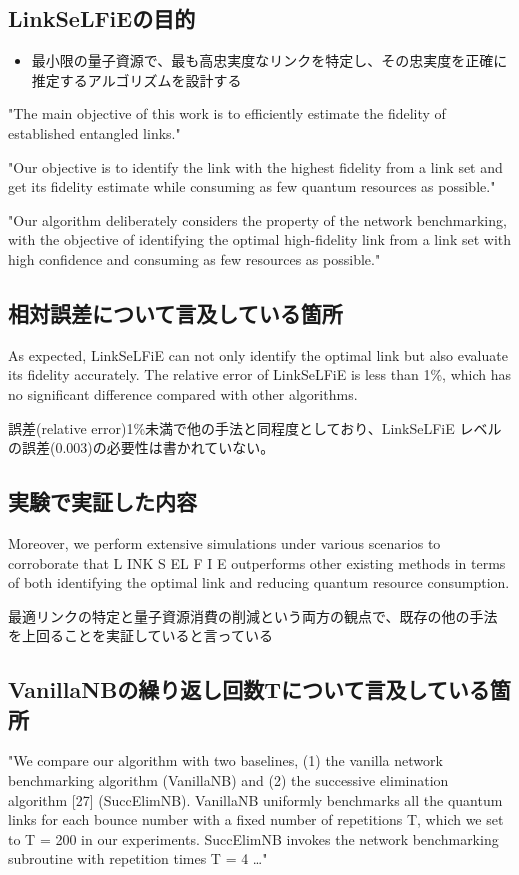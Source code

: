 \documentclass[conference]{IEEEtran}
\begin{document}
\subsection{LinkSeLFiEの目的}
\label{sec:orgf1f29e5}
\begin{itemize}
\item 最小限の量子資源で、最も高忠実度なリンクを特定し、その忠実度を正確に推定するアルゴリズムを設計する
\end{itemize}

"The main objective of this work is to efficiently estimate the fidelity of established entangled links."

"Our objective is to identify the link with the highest fidelity from a
link set and get its fidelity estimate while consuming as few quantum
resources as possible."

"Our algorithm deliberately considers the property of the network
benchmarking, with the objective of identifying the optimal
high-fidelity link from a link set with high confidence and consuming
as few resources as possible."

\subsection{相対誤差について言及している箇所}
\label{sec:org754424a}
As expected, LinkSeLFiE can not only identify the optimal link but
also evaluate its fidelity accurately. The relative error of
LinkSeLFiE is less than 1\%, which has no significant difference
compared with other algorithms.

誤差(relative error)1\%未満で他の手法と同程度としており、LinkSeLFiE
レベルの誤差(0.003)の必要性は書かれていない。


\subsection{実験で実証した内容}
\label{sec:org8034e77}
Moreover, we perform extensive simulations under
various scenarios to corroborate that L INK S EL F I E outperforms
other existing methods in terms of both identifying the optimal
link and reducing quantum resource consumption.

最適リンクの特定と量子資源消費の削減という両方の観点で、既存の他の手法
を上回ることを実証していると言っている

\subsection{VanillaNBの繰り返し回数Tについて言及している箇所}
\label{sec:orgacce58d}
"We compare our algorithm with two baselines, (1) the vanilla network
benchmarking algorithm (VanillaNB) and (2) the successive elimination
algorithm [27] (SuccElimNB).  VanillaNB uniformly benchmarks all the
quantum links for each bounce number with a fixed number of
repetitions T, which we set to T = 200 in our experiments.  SuccElimNB
invokes the network benchmarking subroutine with repetition times T =
4 …"
\end{document}

